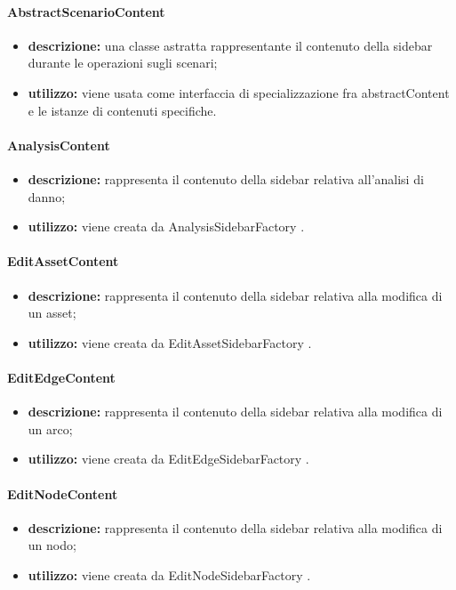 \paragraph{AbstractScenarioContent}
\begin{itemize}
	\item \textbf{descrizione:} una classe astratta rappresentante il contenuto della sidebar durante le operazioni sugli scenari;
	\item \textbf{utilizzo:} viene usata come interfaccia di specializzazione fra abstractContent e le istanze di contenuti specifiche.
\end{itemize}
\paragraph{AnalysisContent}
\begin{itemize}
	\item \textbf{descrizione:} rappresenta il contenuto della sidebar relativa all'analisi di danno;
	\item \textbf{utilizzo:} viene creata da AnalysisSidebarFactory .
\end{itemize}
\paragraph{EditAssetContent}
\begin{itemize}
	\item \textbf{descrizione:} rappresenta il contenuto della sidebar relativa alla modifica di un asset;
	\item \textbf{utilizzo:} viene creata da EditAssetSidebarFactory .
\end{itemize}
\paragraph{EditEdgeContent}
\begin{itemize}
	\item \textbf{descrizione:} rappresenta il contenuto della sidebar relativa alla modifica di un arco;
	\item \textbf{utilizzo:} viene creata da EditEdgeSidebarFactory .
\end{itemize}
\paragraph{EditNodeContent}
\begin{itemize}
	\item \textbf{descrizione:} rappresenta il contenuto della sidebar relativa alla modifica di un nodo;
	\item \textbf{utilizzo:} viene creata da EditNodeSidebarFactory .
\end{itemize}
